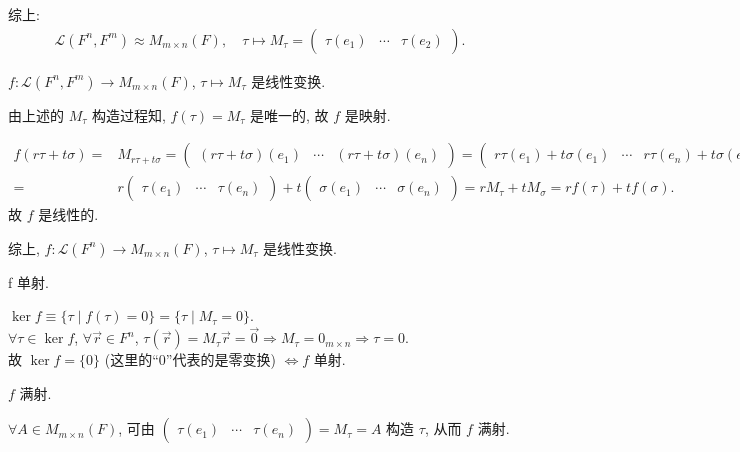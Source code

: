 \documentclass{note}
\begin{document}
综上:
\begin{align*}
    \boxed{\mathcal{L}(F^n,F^m)\approx M_{m\times n}(F),\quad\tau\mapsto M_{\tau}=\begin{pmatrix}
        \tau(e_1)&\cdots&\tau(e_2)
    \end{pmatrix}}.
\end{align*}

$f:\mathcal{L}(F^n,F^m)\rightarrow M_{m\times n}(F)$, $\tau\mapsto M_{\tau}$ 是线性变换.
\begin{pf}
    由上述的 $M_{\tau}$ 构造过程知, $f(\tau)=M_{\tau}$ 是唯一的, 故 $f$ 是映射.

    \begin{align*}
        f(r\tau+t\sigma)=&M_{r\tau+t\sigma}=\begin{pmatrix}
            (r\tau+t\sigma)(e_1)&\cdots&(r\tau+t\sigma)(e_n)
        \end{pmatrix}=\begin{pmatrix}
            r\tau(e_1)+t\sigma(e_1)&\cdots&r\tau(e_n)+t\sigma(e_n)
        \end{pmatrix}\\
        =&r\begin{pmatrix}
            \tau(e_1)&\cdots&\tau(e_n)
        \end{pmatrix}+t\begin{pmatrix}
            \sigma(e_1)&\cdots&\sigma(e_n)
        \end{pmatrix}=rM_{\tau}+tM_{\sigma}=rf(\tau)+tf(\sigma).
    \end{align*}
    故 $f$ 是线性的.

    综上, $f:\mathcal{L}(F^n)\rightarrow M_{m\times n}(F)$, $\tau\mapsto M_{\tau}$ 是线性变换.
\end{pf}

f 单射.
\begin{pf}
    $\ker f\equiv\{\tau\mid f(\tau)=0\}=\{\tau\mid M_{\tau}=0\}$.\\
    $\forall\tau\in\ker f$, $\forall\vec{r}\in F^n$, $\tau(\vec{r})=M_{\tau}\vec{r}=\vec{0}\Longrightarrow M_{\tau}=0_{m\times n}\Longrightarrow\tau=0$.\\
    故 $\ker f=\{0\}$ (这里的``$0$''代表的是零变换) $\Longleftrightarrow f$ 单射.
\end{pf}

$f$ 满射.
\begin{pf}
    $\forall A\in M_{m\times n}(F)$, 可由 $\begin{pmatrix}
        \tau(e_1)&\cdots&\tau(e_n)
    \end{pmatrix}=M_{\tau}=A$ 构造 $\tau$, 从而 $f$ 满射.
\end{pf}
\end{document}
